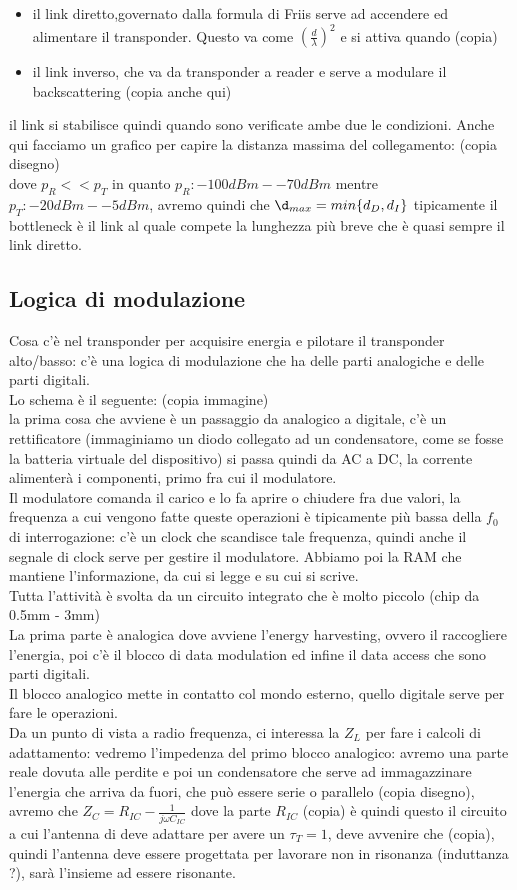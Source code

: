\documentclass[oneside, 12pt]{extbook}
\begin{document}
\begin{itemize}
	\item il link diretto,governato dalla formula di Friis serve ad accendere ed alimentare il transponder. Questo va come $(\frac{d}{\lambda})^2$ e si attiva quando (copia)
	\item il link inverso, che va da transponder a reader e serve a modulare il backscattering (copia anche qui)
\end{itemize}
il link si stabilisce quindi quando sono verificate ambe due le condizioni. Anche qui facciamo un grafico per capire la distanza massima del collegamento: (copia disegno)\\ dove $p_R << p_T$ in quanto $p_R: -100dBm - -70 dBm$ mentre $p_T: -20 dBm - -5 dBm$, avremo quindi che $\d_{max} = min\{d_D, d_I\}$ tipicamente il bottleneck è il link al quale compete la lunghezza più breve che è quasi sempre il link diretto.
\subsection{Logica di modulazione}
Cosa c'è nel transponder per acquisire energia e pilotare il transponder alto/basso: c'è una logica di modulazione che ha delle parti analogiche e delle parti digitali.\\Lo schema è il seguente: (copia immagine)\\
la prima cosa che avviene è un passaggio da analogico a digitale, c'è un rettificatore (immaginiamo un diodo collegato ad un condensatore, come se fosse la batteria virtuale del dispositivo) si passa quindi da AC a DC, la corrente alimenterà i componenti, primo fra cui il modulatore.\\Il modulatore comanda il carico e lo fa aprire o chiudere fra due valori, la frequenza a cui vengono fatte queste operazioni è tipicamente più bassa della $f_0$ di interrogazione: c'è un clock che scandisce tale frequenza, quindi anche il segnale di clock serve per gestire il modulatore. Abbiamo poi la RAM che mantiene l'informazione, da cui si legge e su cui si scrive.\\Tutta l'attività è svolta da un circuito integrato che è molto piccolo (chip da 0.5mm - 3mm)\\La prima parte è analogica dove avviene l'energy harvesting, ovvero il raccogliere l'energia, poi c'è il blocco di data modulation ed infine il data access che sono parti digitali.\\Il blocco analogico mette in contatto col mondo esterno, quello digitale serve per fare le operazioni.\\Da un punto di vista a radio frequenza, ci interessa la $Z_L$ per fare i calcoli di adattamento: vedremo l'impedenza del primo blocco analogico: avremo una parte reale dovuta alle perdite e poi un condensatore che serve ad immagazzinare l'energia che arriva da fuori, che può essere serie o parallelo (copia disegno), avremo che $Z_C = R_{IC} - \frac{1}{j \omega C_{IC}}$ dove la parte $R_{IC}$ (copia) è quindi questo il circuito a cui l'antenna di deve adattare per avere un $\tau_T = 1$, deve avvenire che (copia), quindi l'antenna deve essere progettata per lavorare non in risonanza (induttanza ?), sarà l'insieme ad essere risonante.
\end{document}
